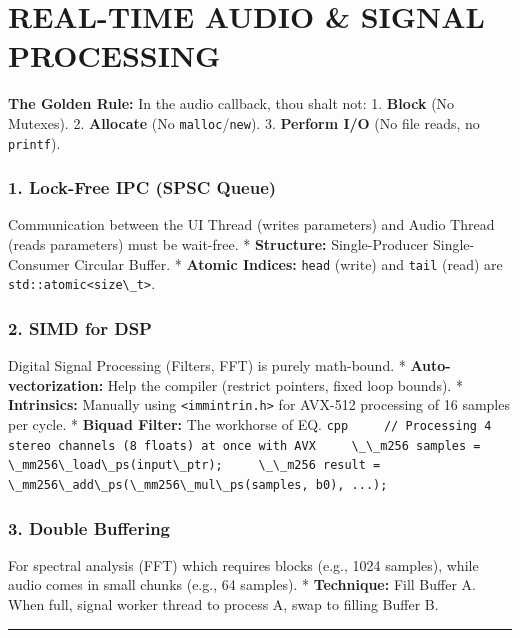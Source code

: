 \hypertarget{real-time-audio-signal-processing}{%
\chapter{REAL-TIME AUDIO \& SIGNAL
PROCESSING}\label{real-time-audio-signal-processing}}

\textbf{The Golden Rule:} In the audio callback, thou shalt not: 1.
\textbf{Block} (No Mutexes). 2. \textbf{Allocate} (No
\passthrough{\lstinline!malloc!}/\passthrough{\lstinline!new!}). 3.
\textbf{Perform I/O} (No file reads, no
\passthrough{\lstinline!printf!}).

\hypertarget{lock-free-ipc-spsc-queue}{%
\subsection{1. Lock-Free IPC (SPSC
Queue)}\label{lock-free-ipc-spsc-queue}}

Communication between the UI Thread (writes parameters) and Audio Thread
(reads parameters) must be wait-free. * \textbf{Structure:}
Single-Producer Single-Consumer Circular Buffer. * \textbf{Atomic
Indices:} \passthrough{\lstinline!head!} (write) and
\passthrough{\lstinline!tail!} (read) are
\passthrough{\lstinline!std::atomic<size\_t>!}.

\hypertarget{simd-for-dsp}{%
\subsection{2. SIMD for DSP}\label{simd-for-dsp}}

Digital Signal Processing (Filters, FFT) is purely math-bound. *
\textbf{Auto-vectorization:} Help the compiler (restrict pointers, fixed
loop bounds). * \textbf{Intrinsics:} Manually using
\passthrough{\lstinline!<immintrin.h>!} for AVX-512 processing of 16
samples per cycle. * \textbf{Biquad Filter:} The workhorse of EQ.
\passthrough{\lstinline!cpp     // Processing 4 stereo channels (8 floats) at once with AVX     \_\_m256 samples = \_mm256\_load\_ps(input\_ptr);     \_\_m256 result = \_mm256\_add\_ps(\_mm256\_mul\_ps(samples, b0), ...);!}

\hypertarget{double-buffering}{%
\subsection{3. Double Buffering}\label{double-buffering}}

For spectral analysis (FFT) which requires blocks (e.g., 1024 samples),
while audio comes in small chunks (e.g., 64 samples). *
\textbf{Technique:} Fill Buffer A. When full, signal worker thread to
process A, swap to filling Buffer B.

\begin{center}\rule{0.5\linewidth}{0.5pt}\end{center}
